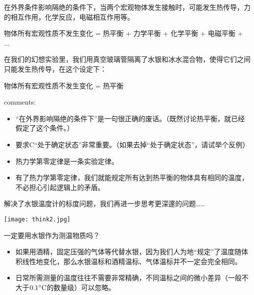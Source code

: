 \documentclass[CJK]{beamer}
\begin{document}
\begin{frame}
\bch
在外界条件影响隔绝的条件下，当两个宏观物体发生接触时，可能发生热传导，力的相互作用，化学反应，电磁相互作用等。

\skipline

物体所有宏观性质不发生变化 = 热平衡 + 力学平衡 + 化学平衡 + 电磁平衡 + ... 

\skiplines

在我们的幻想实验里，我们用真空玻璃管隔离了水银和冰水混合物，使得它们之间只能发生热传导，在这个设定下：

\skipline

物体所有宏观性质不发生变化 = 热平衡

\ech
\end{frame}

\begin{frame}
\bch
{\large {}}

\skiplines

comments:
\begin{itemize}
\item{“在外界影响隔绝的条件下”是一句很正确的废话。{\small（既然讨论热平衡，就已经假定了这个条件。）}}
\item{要求C“处于确定状态”非常重要。（如果去掉“处于确定状态”，请试举个反例）}
\item{热力学第零定律是一条实验定律。}
\item{有了热力学第零定律，我们就能规定所有达到热平衡的物体具有相同的温度，不必担心引起逻辑上的矛盾。}
\end{itemize}
\ech
\end{frame}

\begin{frame}
\bch
解决了水银温度计的标度问题，我们再进一步思考更深邃的问题……
\begin{center}
\texttt{[image: think2.jpg]}
\end{center}
\ech
\end{frame}

\begin{frame}
\bch
一定要用水银作为测温物质吗？

\skiplines

\begin{itemize}
\item{如果用酒精，固定压强的气体等代替水银，因为我们人为地“规定”了温度随体积线性地变化，那么水银温标和酒精温标、气体温标并不一定会完全相同。}
\item{日常所需测量的温度往往不需要非常精确，不同温标之间的微小差异（一般不大于$0.1^\circ \mathrm{C}$的数量级）可以忽略。}
\end{itemize}

\ech
\end{frame}
\end{document}
